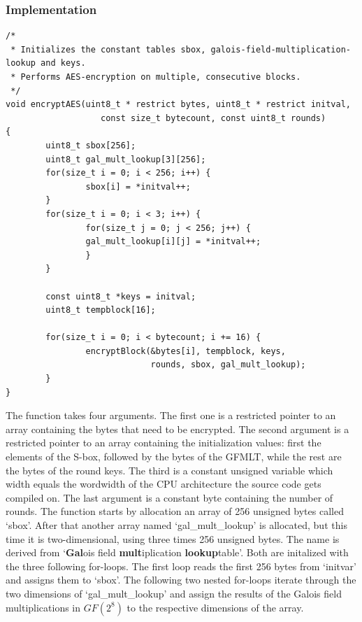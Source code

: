 \hypertarget{implementation-6}{%
\subsubsection{Implementation}\label{implementation-6}}

\begin{lstlisting}
/*
 * Initializes the constant tables sbox, galois-field-multiplication-lookup and keys.
 * Performs AES-encryption on multiple, consecutive blocks.
 */
void encryptAES(uint8_t * restrict bytes, uint8_t * restrict initval, 
                   const size_t bytecount, const uint8_t rounds)
{   
        uint8_t sbox[256];
        uint8_t gal_mult_lookup[3][256];
        for(size_t i = 0; i < 256; i++) {
                sbox[i] = *initval++;
        }
        for(size_t i = 0; i < 3; i++) {
                for(size_t j = 0; j < 256; j++) {
                gal_mult_lookup[i][j] = *initval++;
                }
        }
        
        const uint8_t *keys = initval;
        uint8_t tempblock[16];
        
        for(size_t i = 0; i < bytecount; i += 16) {
                encryptBlock(&bytes[i], tempblock, keys, 
                             rounds, sbox, gal_mult_lookup);
        }
}
\end{lstlisting}

The function takes four arguments. The first one is a restricted pointer
to an array containing the bytes that need to be encrypted. The second
argument is a restricted pointer to an array containing the
initialization values: first the elements of the S-box, followed by the
bytes of the GFMLT, while the rest are the bytes of the round keys. The
third is a constant unsigned variable which width equals the wordwidth
of the CPU architecture the source code gets compiled on. The last
argument is a constant byte containing the number of rounds. The
function starts by allocation an array of 256 unsigned bytes called
`sbox'. After that another array named `gal\_mult\_lookup' is allocated,
but this time it is two-dimensional, using three times 256 unsigned
bytes. The name is derived from `\textbf{Gal}ois field
\textbf{mult}iplication \textbf{lookup}table'. Both are initalized with
the three following for-loops. The first loop reads the first 256 bytes
from `initvar' and assigns them to `sbox'. The following two nested
for-loops iterate through the two dimensions of `gal\_mult\_lookup' and
assign the results of the Galois field multiplications in $GF(2^{8})$ to the
respective dimensions of the array.

